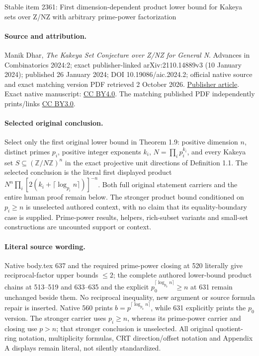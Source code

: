 \documentclass[11pt]{article}
\numberwithin{equation}{section}
\begin{document}
\begin{center}{\Large Stable item 2361: First dimension-dependent product lower bound for Kakeya sets over Z/NZ with arbitrary prime-power factorization}\end{center}
\paragraph{Source and attribution.} Manik Dhar, \emph{The Kakeya Set Conjecture over Z/NZ for General N}. Advances in Combinatorics 2024:2; exact publisher-linked arXiv:2110.14889v3 (10 January 2024); published 26 January 2024; DOI 10.19086/aic.2024.2; official native source and exact matching version PDF retrieved 2 October 2026. \href{https://www.advancesincombinatorics.com/article/92090-the-kakeya-set-conjecture-over-z-nz-for-general-n}{Publisher article}. Exact native manuscript: \href{https://creativecommons.org/licenses/by/4.0/}{CC BY4.0}. The matching published PDF independently prints/links \href{https://creativecommons.org/licenses/by/3.0/}{CC BY3.0}.
\paragraph{Selected original conclusion.} Select only the first original lower bound in Theorem 1.9: positive dimension \(n\), distinct primes \(p_i\), positive integer exponents \(k_i\), \(N=\prod_i p_i^{k_i}\), and every Kakeya set \(S\subseteq(\mathbb Z/N\mathbb Z)^n\) in the exact projective unit directions of Definition 1.1. The selected conclusion is the literal first displayed product \(N^n\prod_i[2(k_i+\lceil\log_{p_i}n\rceil)]^{-n}\). Both full original statement carriers and the entire human proof remain below. The stronger product bound conditioned on \(p_i\ge n\) is unselected authored context, with no claim that its equality-boundary case is supplied. Prime-power results, helpers, rich-subset variants and small-set constructions are uncounted support or context.
\paragraph{Literal source wording.} Native body.tex 637 and the required prime-power closing at 520 literally give reciprocal-factor upper bounds \(\le2\); the complete authored lower-bound product chains at 513--519 and 633--635 and the explicit \(p_0^{\lceil\log_{p_0}n\rceil}\ge n\) at 631 remain unchanged beside them. No reciprocal inequality, new argument or source formula repair is inserted. Native 560 prints \(b=p^{\lceil\log_{p_0}n\rceil}\), while 631 explicitly prints the \(p_0\) version. The stronger carrier uses \(p_i\ge n\), whereas its prime-power carrier and closing use \(p>n\); that stronger conclusion is unselected. All original quotient-ring notation, multiplicity formulas, CRT direction/offset notation and Appendix A displays remain literal, not silently standardized.
\end{document}
